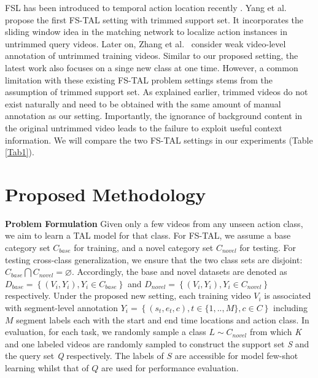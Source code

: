 \documentclass{bmvc2k}
\begin{document}
FSL has been introduced to temporal action location recently \cite{yang2018one,zhang2020metal,yang2020localizing}.
Yang et al.~\cite{yang2018one}
propose the first FS-TAL setting with trimmed support set. It incorporates the sliding window idea in the matching network \cite{vinyals2016matching} to localize action instances in untrimmed query videos.
Later on, Zhang et al.~\cite{zhang2020metal} consider weak video-level annotation of untrimmed training videos.
Similar to our proposed setting, the latest work \cite{yang2018one} also focuses on a singe new class at one time. However, a common limitation with these existing FS-TAL problem settings stems from the assumption of trimmed support set.
As explained earlier,  trimmed videos do not exist naturally and need to be obtained with the same amount of manual annotation as our setting. Importantly, the ignorance of background content in the original untrimmed video leads to the failure to exploit useful context information.
 We will compare the two FS-TAL settings in our experiments (Table \ref{Tab1}).








\vspace{-0.15in}
\section{Proposed Methodology}

{\bf Problem Formulation} 
Given only a few videos from any unseen action class, we aim to learn a TAL model for that class.
For FS-TAL, we assume a base category set $C_{base}$ for training, and a novel category set $C_{novel}$ for testing.
For testing cross-class generalization,
we ensure that the two class sets are disjoint: $C_{base} \bigcap C_{novel} = \varnothing$.
Accordingly, the base and novel datasets are denoted as 
$D_{base} = \left \{ \left ( V_{i}, Y_{i} \right ), Y_{i} \in C_{base}\right \}$ and $D_{novel} = \left \{ \left ( V_{i}, Y_{i} \right ) , Y_{i} \in C_{novel}\right \}$ respectively.
Under the proposed new setting, each training video $V_{i}$ is associated with
segment-level annotation 
$Y_{i} = \left \{ (s_{t},e_{t},c), t \in \{1,..,M\}, c \in \textit{C}\right \}$ including $M$ segment labels each with the start and end time locations and action class. 
In evaluation, 
for each task, we randomly sample a class $\textit{L} \sim C_{novel} $ from which \textit{K} and one labeled videos are randomly sampled to construct the support set \textit{S} and the query set \textit{Q} respectively. 
The labels of $S$ are accessible for model few-shot learning
whilst that of $Q$ are used for performance evaluation.
\end{document}

